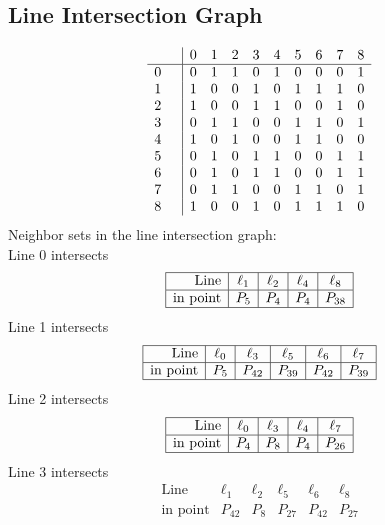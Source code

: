 \documentclass{article}
\begin{document}
{\subsection*{Line Intersection Graph}
{\arraycolsep=1pt
$$
\begin{array}{rr|*{9}r}
 &  & 0 & 1 & 2 & 3 & 4 & 5 & 6 & 7 & 8\\
\hline
0 &  & 0 & 1 & 1 & 0 & 1 & 0 & 0 & 0 & 1\\
1 &  & 1 & 0 & 0 & 1 & 0 & 1 & 1 & 1 & 0\\
2 &  & 1 & 0 & 0 & 1 & 1 & 0 & 0 & 1 & 0\\
3 &  & 0 & 1 & 1 & 0 & 0 & 1 & 1 & 0 & 1\\
4 &  & 1 & 0 & 1 & 0 & 0 & 1 & 1 & 0 & 0\\
5 &  & 0 & 1 & 0 & 1 & 1 & 0 & 0 & 1 & 1\\
6 &  & 0 & 1 & 0 & 1 & 1 & 0 & 0 & 1 & 1\\
7 &  & 0 & 1 & 1 & 0 & 0 & 1 & 1 & 0 & 1\\
8 &  & 1 & 0 & 0 & 1 & 0 & 1 & 1 & 1 & 0\\
\end{array}
$$
}%
Neighbor sets in the line intersection graph:\\
Line 0 intersects 
$$
\begin{array}{|r*{4}{|c}|}
\hline
\mbox{Line}  & \ell_{1} & \ell_{2} & \ell_{4} & \ell_{8}\\
\hline
\mbox{in point}  & P_{5} & P_{4} & P_{4} & P_{38}\\
\hline
\end{array}
$$
Line 1 intersects 
$$
\begin{array}{|r*{5}{|c}|}
\hline
\mbox{Line}  & \ell_{0} & \ell_{3} & \ell_{5} & \ell_{6} & \ell_{7}\\
\hline
\mbox{in point}  & P_{5} & P_{42} & P_{39} & P_{42} & P_{39}\\
\hline
\end{array}
$$
Line 2 intersects 
$$
\begin{array}{|r*{4}{|c}|}
\hline
\mbox{Line}  & \ell_{0} & \ell_{3} & \ell_{4} & \ell_{7}\\
\hline
\mbox{in point}  & P_{4} & P_{8} & P_{4} & P_{26}\\
\hline
\end{array}
$$
Line 3 intersects 
$$
\begin{array}{|r*{5}{|c}|}
\hline
\mbox{Line}  & \ell_{1} & \ell_{2} & \ell_{5} & \ell_{6} & \ell_{8}\\
\hline
\mbox{in point}  & P_{42} & P_{8} & P_{27} & P_{42} & P_{27}\\

\end{array}$$}
\end{document}
